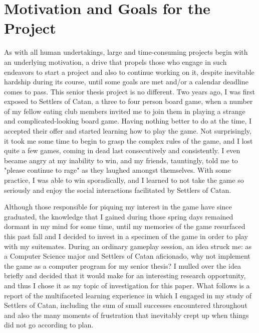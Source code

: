\documentclass[pageno]{jpaper}
\begin{document}
\begin{doublespacing}

\hypertarget{sec:motivation_and_goals_for_the_project}{}
\section{Motivation and Goals for the Project}

As with all human undertakings, large and time-consuming projects begin with an underlying motivation, a drive that propels those who engage in such endeavors to start a project and also to continue working on it, despite inevitable hardship during its course, until some goals are met and/or a calendar deadline comes to pass. This senior thesis project is no different. Two years ago, I was first exposed to Settlers of Catan, a three to four person board game, when a number of my fellow eating club members invited me to join them in playing a strange and complicated-looking board game. Having nothing better to do at the time, I accepted their offer and started learning how to play the game. Not surprisingly, it took me some time to begin to grasp the complex rules of the game, and I lost quite a few games, coming in dead last consecutively and consistently. I even became angry at my inability to win, and my friends, tauntingly, told me to "please continue to rage" as they laughed amongst themselves. With some practice, I was able to win sporadically, and I learned to not take the game so seriously and enjoy the social interactions facilitated by Settlers of Catan. 

Although those responsible for piquing my interest in the game have since graduated, the knowledge that I gained during those spring days remained dormant in my mind for some time, until my memories of the game resurfaced this past fall and I decided to invest in a specimen of the game in order to play with my suitemates. During an ordinary gameplay session, an idea struck me: as a Computer Science major and Settlers of Catan aficionado, why not implement the game as a computer program for my senior thesis? I mulled over the idea briefly and decided that it would make for an interesting research opportunity, and thus I chose it as my topic of investigation for this paper. What follows is a report of the multifaceted learning experience in which I engaged in my study of Settlers of Catan, including the sum of small successes encountered throughout and also the many moments of frustration that inevitably crept up when things did not go according to plan.


\end{doublespacing}
\end{document}
